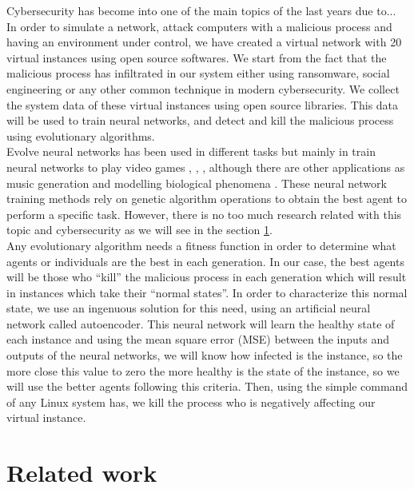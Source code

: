 \documentclass{iosart2c}
\begin{document}
Cybersecurity has become into one of the main topics of the last years due to...\\

In order to simulate a network, attack computers with a malicious process and having an environment under control, we have created a virtual network with 20 virtual instances using open source softwares. We start from the fact that the malicious process has infiltrated in our system either using ransomware, social engineering or any other common technique in modern cybersecurity. We collect the system data of these virtual instances using open source libraries. This data will be used to train neural networks, and detect and kill the malicious process using evolutionary algorithms.\\

Evolve neural networks has been used in different tasks but mainly in train neural networks to play video games \cite{deepGA}, \cite{neuroevolution1}, \cite{neuroevolution2}, although there are other applications as music generation \cite{neuroevolution3} and modelling biological phenomena \cite{neuroevolution4}. These neural network training methods rely on genetic algorithm operations to obtain the best agent to perform a specific task. However, there is no too much research related with this topic and cybersecurity as we will see in the section \ref{relatedwork}.\\

Any evolutionary algorithm needs a fitness function in order to determine what agents or individuals are the best in each generation. In our case, the best agents will be those who ``kill'' the malicious process in each generation which will result in instances which take their ``normal states''. In order to characterize this normal state, we use an ingenuous solution for this need, using an artificial neural network called autoencoder. This neural network will learn the healthy state of each instance and using the mean square error (MSE) between the inputs and outputs of the neural networks, we will know how infected is the instance, so the more close this value to zero the more healthy is the state of the instance, so we will use the better agents following this criteria. Then, using the simple command of any Linux system has, we kill the process who is negatively affecting our virtual instance.


\section{Related work}\label{relatedwork}
\end{document}
